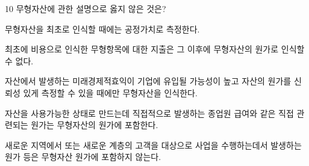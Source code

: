 \begin{question}{10}
무형자산에 관한 설명으로 옳지 않은 것은?
\begin{choices}
  \item 무형자산을 최초로 인식할 때에는 공정가치로 측정한다.
  \item 최초에 비용으로 인식한 무형항목에 대한 지출은 그 이후에 무형자산의 원가로 인식할 수 없다.
  \item 자산에서 발생하는 미래경제적효익이 기업에 유입될 가능성이 높고 자산의 원가를 신뢰성 있게 측정할 수 있을 때에만 무형자산을 인식한다.
  \item 자산을 사용가능한 상태로 만드는데 직접적으로 발생하는 종업원 급여와 같은 직접 관련되는 원가는 무형자산의 원가에 포함한다.
  \item 새로운 지역에서 또는 새로운 계층의 고객을 대상으로 사업을 수행하는데서 발생하는 원가 등은 무형자산 원가에 포함하지 않는다.
\end{choices}
\end{question}
